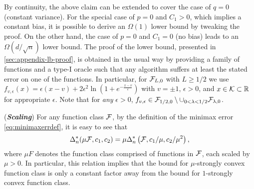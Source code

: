 
By continuity, the above claim can be extended to cover the case of $q=0$ (constant variance). 
For the special case of $p=0$ and $C_1>0$, which implies a constant bias, it is possible to derive an $\Omega(1)$ lower bound by tweaking the proof. On the other hand, the case of $p=0$ and $C_1=0$ (no bias) leads to an $\Omega(d/\sqrt{n})$ lower bound. The proof of the lower bound, presented in \cref{sec:appendix-lb-proof}, is obtained in the usual way by providing a family of functions and a type-I oracle such that any algorithm suffers at least the stated error on one of the functions. In particular, for $\mathcal{F}_{L,0}$ with $L\ge 1/2$ we use
$f_{v,\epsilon}(x)=\epsilon\left( x-v\right)+2\epsilon^2 \ln\left(1+e^{-\frac{x-v}{\epsilon}}  \right)$ with $v=\pm 1$, $\epsilon>0$, and $x \in \mathcal{K} \subset \mathbb{R}$ for appropriate $\epsilon$. Note that for \emph{any} $\epsilon>0$, $f_{v,\epsilon}\in \mathcal{F}_{1/2,0}\setminus \cup_{0<\lambda<1/2} \mathcal{F}_{\lambda,0}$.


\begin{remark}(\textbf{\textit{Scaling}})
For any function class $\mathcal{F}$, by the definition of the minimax error \eqref{eq:minimaxerrdef}, it is easy to see that
$$\Delta_n^*(\mu \mathcal{F}, c_1,c_2) = \mu \Delta_n^*\left(\mathcal{F}, c_1/\mu,c_2/\mu^2\right),$$
 where $\mu F$ denotes the function class comprised of functions in $\mathcal{F}$, each scaled by $\mu>0$. In particular, this relation implies that the bound for $\mu$-strongly convex function class is only a constant factor away from the bound for $1$-strongly convex function class.
\end{remark}

